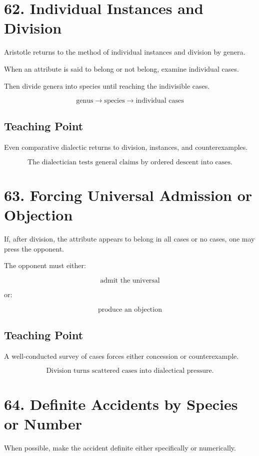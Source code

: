 \documentclass[12pt]{article}
\begin{document}
\section*{62. Individual Instances and Division}

Aristotle returns to the method of individual instances and division by genera.

When an attribute is said to belong or not belong, examine individual cases.

Then divide genera into species until reaching the indivisible cases.

\[
\text{genus}
\rightarrow
\text{species}
\rightarrow
\text{individual cases}
\]

\subsection*{Teaching Point}

Even comparative dialectic returns to division, instances, and counterexamples.

\[
\boxed{
\text{The dialectician tests general claims by ordered descent into cases.}
}
\]

\section*{63. Forcing Universal Admission or Objection}

If, after division, the attribute appears to belong in all cases or no cases,
one may press the opponent.

The opponent must either:

\[
\text{admit the universal}
\]

or:

\[
\text{produce an objection}
\]

\subsection*{Teaching Point}

A well-conducted survey of cases forces either concession or counterexample.

\[
\boxed{
\text{Division turns scattered cases into dialectical pressure.}
}
\]

\section*{64. Definite Accidents by Species or Number}

When possible, make the accident definite either specifically or numerically.
\end{document}
